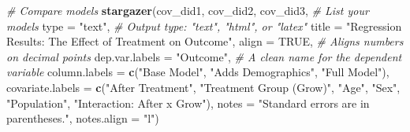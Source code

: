\documentclass[
]{article}
\newenvironment{Shaded}{\begin{snugshade}}{\end{snugshade}}
\newcommand{\AttributeTok}[1]{\textcolor[rgb]{0.13,0.29,0.53}{#1}}
\newcommand{\CommentTok}[1]{\textcolor[rgb]{0.56,0.35,0.01}{\textit{#1}}}
\newcommand{\ConstantTok}[1]{\textcolor[rgb]{0.56,0.35,0.01}{#1}}
\newcommand{\FunctionTok}[1]{\textcolor[rgb]{0.13,0.29,0.53}{\textbf{#1}}}
\newcommand{\NormalTok}[1]{#1}
\newcommand{\StringTok}[1]{\textcolor[rgb]{0.31,0.60,0.02}{#1}}
\begin{document}
\begin{Shaded}
\begin{Highlighting}[]
\CommentTok{\# Compare models}
\FunctionTok{stargazer}\NormalTok{(cov\_did1, cov\_did2, cov\_did3,      }\CommentTok{\# List your models}
          \AttributeTok{type =} \StringTok{"text"}\NormalTok{,                   }\CommentTok{\# Output type: "text", "html", or "latex"}
          \AttributeTok{title =} \StringTok{"Regression Results: The Effect of Treatment on Outcome"}\NormalTok{,}
          \AttributeTok{align =} \ConstantTok{TRUE}\NormalTok{,                    }\CommentTok{\# Aligns numbers on decimal points}
          \AttributeTok{dep.var.labels =} \StringTok{"Outcome"}\NormalTok{,      }\CommentTok{\# A clean name for the dependent variable}
          \AttributeTok{column.labels =} \FunctionTok{c}\NormalTok{(}\StringTok{"Base Model"}\NormalTok{, }\StringTok{"Adds Demographics"}\NormalTok{, }\StringTok{"Full Model"}\NormalTok{),}
          \AttributeTok{covariate.labels =} \FunctionTok{c}\NormalTok{(}\StringTok{"After Treatment"}\NormalTok{, }\StringTok{"Treatment Group (Grow)"}\NormalTok{, }\StringTok{"Age"}\NormalTok{,}
                               \StringTok{"Sex"}\NormalTok{, }\StringTok{"Population"}\NormalTok{, }\StringTok{"Interaction: After x Grow"}\NormalTok{),}
          \AttributeTok{notes =} \StringTok{"Standard errors are in parentheses."}\NormalTok{,}
          \AttributeTok{notes.align =} \StringTok{"l"}\NormalTok{)}
\end{Highlighting}
\end{Shaded}
\end{document}
